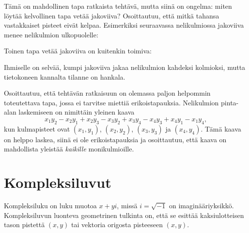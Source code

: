 Tämä on mahdollinen tapa ratkaista tehtävä,
mutta siinä on ongelma:
miten löytää kelvollinen tapa vetää jakoviiva?
Osoittautuu, että
mitkä tahansa vastakkaiset pisteet eivät kelpaa.
Esimerkiksi seuraavassa nelikulmiossa
jakoviiva menee nelikulmion ulkopuolelle:
\begin{center}
\end{center}
Toinen tapa vetää jakoviiva on kuitenkin toimiva:
\begin{center}
\end{center}
Ihmiselle on selvää, kumpi jakoviiva jakaa nelikulmion
kahdeksi kolmioksi, mutta tietokoneen kannalta
tilanne on hankala.

Osoittautuu, että tehtävän ratkaisuun on olemassa
paljon helpommin toteutettava tapa,
jossa ei tarvitse miettiä erikoistapauksia.
Nelikulmion pinta-alan laskemiseen
on nimittäin yleinen kaava
\[x_1y_2-x_2y_1+x_2y_3-x_3y_2+x_3y_4-x_4y_3+x_4y_1-x_1y_4,\]
kun kulmapisteet ovat
$(x_1,y_1)$,
$(x_2,y_2)$,
$(x_3,y_3)$ ja
$(x_4,y_4)$.
Tämä kaava on helppo laskea, siinä ei ole erikoistapauksia
ja osoittautuu, että kaava on mahdollista yleistää
\textit{kaikille} monikulmioille.

\section{Kompleksiluvut}


Kompleksiluku on luku muotoa $x+y i$, missä $i = \sqrt{-1}$
on imaginääriyksikkö.
Kompleksiluvun luonteva geometrinen tulkinta on,
että se esittää kaksiulotteisen tason pistettä $(x,y)$
tai vektoria origosta pisteeseen $(x,y)$.


